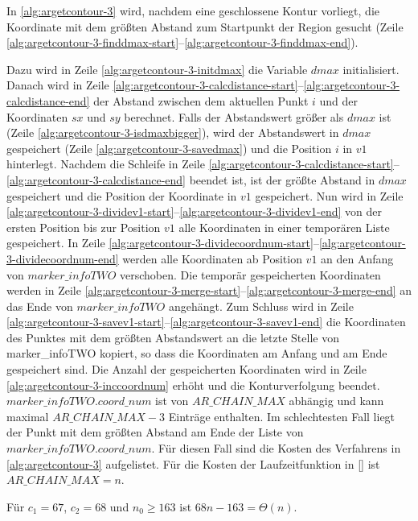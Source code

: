 In \autoref{alg:argetcontour-3} wird, nachdem eine geschlossene Kontur vorliegt, die Koordinate mit dem größten Abstand
 zum Startpunkt der Region gesucht (Zeile
 \ref{alg:argetcontour-3-finddmax-start}--\ref{alg:argetcontour-3-finddmax-end}).

Dazu wird in Zeile \ref{alg:argetcontour-3-initdmax} die Variable $\mathit{dmax}$ initialisiert. Danach wird in Zeile
 \ref{alg:argetcontour-3-calcdistance-start}--\ref{alg:argetcontour-3-calcdistance-end} der Abstand zwischen dem
 aktuellen Punkt $i$ und der Koordinaten $\mathit{sx}$ und $\mathit{sy}$ berechnet. Falls der Abstandswert größer als
 $\mathit{dmax}$ ist (Zeile \ref{alg:argetcontour-3-isdmaxbigger}), wird der Abstandswert in $\mathit{dmax}$
 gespeichert (Zeile \ref{alg:argetcontour-3-savedmax}) und die Position $i$ in $\mathit{v1}$ hinterlegt. Nachdem die
 Schleife in Zeile \ref{alg:argetcontour-3-calcdistance-start}--\ref{alg:argetcontour-3-calcdistance-end} beendet ist,
 ist der größte Abstand in $\mathit{dmax}$ gespeichert und die Position der Koordinate in $\mathit{v1}$ gespeichert.
 Nun wird in Zeile \ref{alg:argetcontour-3-dividev1-start}--\ref{alg:argetcontour-3-dividev1-end} von der ersten
 Position bis zur Position $\mathit{v1}$ alle Koordinaten in einer temporären Liste gespeichert. In Zeile
 \ref{alg:argetcontour-3-dividecoordnum-start}--\ref{alg:argetcontour-3-dividecoordnum-end} werden alle Koordinaten ab
 Position $\mathit{v1}$ an den Anfang von $\mathit{marker\_infoTWO}$ verschoben. Die temporär gespeicherten Koordinaten
 werden in Zeile \ref{alg:argetcontour-3-merge-start}--\ref{alg:argetcontour-3-merge-end} an das Ende von
 $\mathit{marker\_infoTWO}$ angehängt. Zum Schluss wird in Zeile
 \ref{alg:argetcontour-3-savev1-start}--\ref{alg:argetcontour-3-savev1-end} die Koordinaten des Punktes mit dem größten
 Abstandswert an die letzte Stelle von marker\_infoTWO kopiert, so dass die Koordinaten am Anfang und am Ende
 gespeichert sind. Die Anzahl der gespeicherten Koordinaten wird in Zeile \ref{alg:argetcontour-3-inccoordnum} erhöht
 und die Konturverfolgung beendet. $\mathit{marker\_infoTWO.coord\_num}$ ist von $\mathit{AR\_CHAIN\_MAX}$ abhängig und
 kann maximal $\mathit{AR\_CHAIN\_MAX} - 3$ Einträge enthalten. Im schlechtesten Fall liegt der Punkt mit dem größten
 Abstand am Ende der Liste von $\mathit{marker\_infoTWO.coord\_num}$. Für diesen Fall sind die Kosten des Verfahrens
 in \autoref{alg:argetcontour-3} aufgelistet. Für die Kosten der Laufzeitfunktion in
 \autoref{} ist $\mathit{AR\_CHAIN\_MAX} = n$.

Für $c_{1} = 67$, $c_{2} = 68$ und $n_{0} \geq 163$ ist $68n - 163 = \Theta(n)$.

